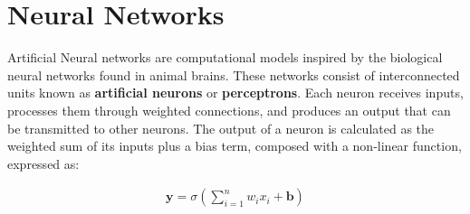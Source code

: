





\section{Neural Networks}

Artificial Neural networks are computational models inspired by the biological neural networks found in animal brains. These networks consist of interconnected units known as \textbf{artificial neurons} or \textbf{perceptrons}. Each neuron receives inputs, processes them through weighted connections, and produces an output that can be transmitted to other neurons. The output of a neuron is calculated as the weighted sum of its inputs plus a bias term, composed with a non-linear function, expressed as:

\begin{align}
  \mathbf{y} = \sigma\left(\sum_{i=1}^{n} w_i x_i + \mathbf{b}\right)
  \label{eq:nn-compute}
\end{align}

